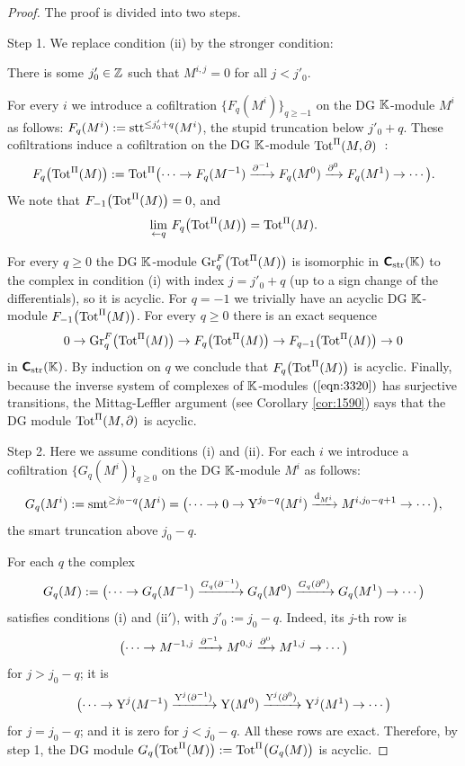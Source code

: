 \begin{proof} The proof is divided into two steps. 

\smallskip \noindent
Step 1. We replace condition (ii) by the stronger condition: 
\begin{itemize}
 There is some $j'_{0} \in \mathbb{Z}$ such that 
$M^{i, j} = 0$ for all $j < j'_{0}$. 
\end{itemize}
For every $i$ we introduce a cofiltration 
$\{ F_q(M^i) \}_{q \geq -1}$
on the DG $\mathbb{K}$-module $M^i$ as follows: 
$F_q (M^i) := \operatorname{stt}^{\leq j'_{0} + q}(M^i)$, 
the stupid truncation below $j'_{0} + q$. 
These cofiltrations induce a cofiltration on the DG $\mathbb{K}$-module 
$\operatorname{Tot}^{\Pi}(M, \partial)$~: 
\[ F_q \bigl( \operatorname{Tot}^{\Pi}(M) \bigr) := 
\operatorname{Tot}^{\Pi} 
\bigl( \cdots \to F_q(M^{-1}) \xrightarrow{\partial^{-1}}
F_q(M^{0}) \xrightarrow{\partial^{0}} F_q(M^{1}) \to \cdots \bigr) . \]
We note that $F_{-1} \bigl( \operatorname{Tot}^{\Pi}(M) \bigr) = 0$, and 
\begin{equation} \label{eqn:3320}
\lim_{\leftarrow q} \, F_q \bigl( \operatorname{Tot}^{\Pi}(M) \bigr) = 
\operatorname{Tot}^{\Pi}(M) . 
\end{equation}

For every $q \geq 0$ the DG $\mathbb{K}$-module 
$\operatorname{Gr}^F_q \bigl( \operatorname{Tot}^{\Pi}(M) \bigr)$
is isomorphic in $\boldsymbol{\mathsf{C}}_{\mathrm{str}}(\mathbb{K})$ to the complex in condition (i) 
with index $j = j'_{0} + q$ (up to a sign change of the differentials), so it 
is acyclic. For $q = -1$ we trivially have an acyclic DG $\mathbb{K}$-module 
$F_{-1} \bigl( \operatorname{Tot}^{\Pi}(M) \bigr)$. 
For every $q \geq 0$ there is an exact sequence 
\[ 0 \to \operatorname{Gr}^F_q \bigl( \operatorname{Tot}^{\Pi}(M) \bigr) \to 
F_q \bigl( \operatorname{Tot}^{\Pi}(M) \bigr) \to
F_{q - 1} \bigl( \operatorname{Tot}^{\Pi}(M) \bigr) \to 0 \]
in $\boldsymbol{\mathsf{C}}_{\mathrm{str}}(\mathbb{K})$. By induction on $q$ we conclude that 
$F_q \bigl( \operatorname{Tot}^{\Pi}(M) \bigr)$
is acyclic. Finally, because the inverse system of complexes of $\mathbb{K}$-modules
$(\ref{eqn:3320})$ has surjective transitions, the Mittag-Leffler argument 
(see Corollary \ref{cor:1590}) says that the DG module 
$\operatorname{Tot}^{\Pi}(M, \partial)$ is acyclic. 

\medskip \noindent 
Step 2. Here we assume conditions (i) and (ii). 
For each $i$ we introduce a cofiltration 
$\{ G_q(M^i) \}_{q \geq 0}$
on the DG $\mathbb{K}$-module $M^i$ as follows: 
\[ G_q(M^i) := \operatorname{smt}^{\geq j_0 - q}(M^i) = 
\bigl( \cdots \to 0 \to \operatorname{Y}^{j_0 - q}(M^i) 
\xrightarrow{\mathrm{d}_{M^i}} M^{i, j_0 - q + 1} \to \cdots \bigr) , \]
the smart truncation above $j_0 - q$. 

For each $q$ the complex 
\[ G_q(M) := \bigl( \cdots \to G_q(M^{-1}) \xrightarrow{G_q(\partial^{-1})}
G_q(M^{0}) \xrightarrow{G_q(\partial^{0})} G_q(M^{1}) \to \cdots \bigr) \]
satisfies conditions (i) and (ii$'$), with $j'_{0} := j_0 - q$.
Indeed, its $j$-th row is 
\[ \bigl( \cdots \to M^{-1, j} \xrightarrow{\partial^{-1}}
M^{0, j} \xrightarrow{\partial^{0}} M^{1, j} \to \cdots \bigr) \]
for $j > j_0 - q$; it is 
\[ \bigl( \cdots \to \operatorname{Y}^j(M^{-1}) \xrightarrow{\operatorname{Y}^j(\partial^{-1})}
\operatorname{Y}(M^{0}) \xrightarrow{\operatorname{Y}^j(\partial^{0})} \operatorname{Y}^j(M^{1}) \to \cdots \bigr) \]
for $j = j_0 - q$; and it is zero for $j < j_0 - q$. All these rows are exact. 
Therefore, by step 1, the DG module 
$G_q \bigl( \operatorname{Tot}^{\Pi}(M) \bigr) := \operatorname{Tot}^{\Pi} \bigl( G_q(M) \bigr)$
is acyclic. 


\end{proof}
